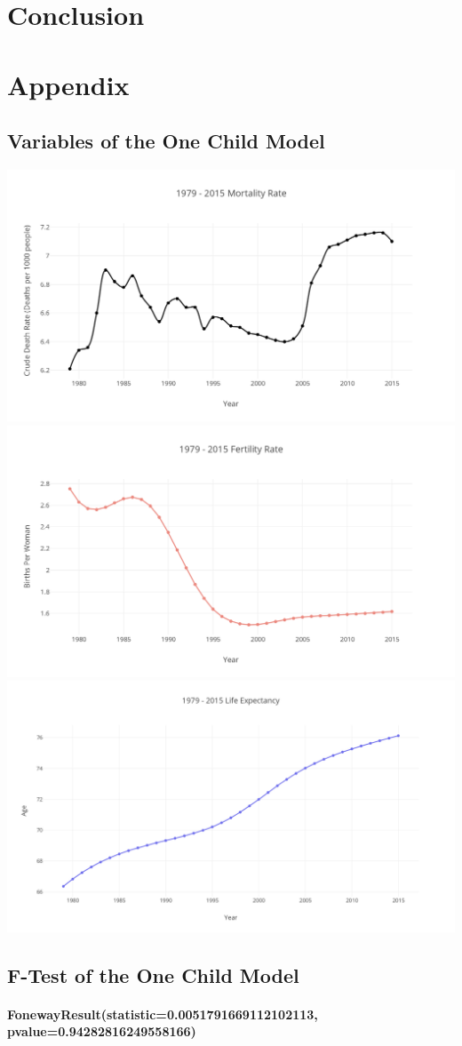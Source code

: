 \documentclass{article}
\begin{document}
\paragraph{}


\section{Conclusion}

\section{Appendix}
\subsection{Variables of the One Child Model}
\includegraphics{MortalityRate.png}
\includegraphics{FertilityRate.png}
\includegraphics{LifeExpectancy.png}

\subsection{F-Test of the One Child Model}
\paragraph{FonewayResult(statistic=0.0051791669112102113, pvalue=0.94282816249558166)}
\end{document}
